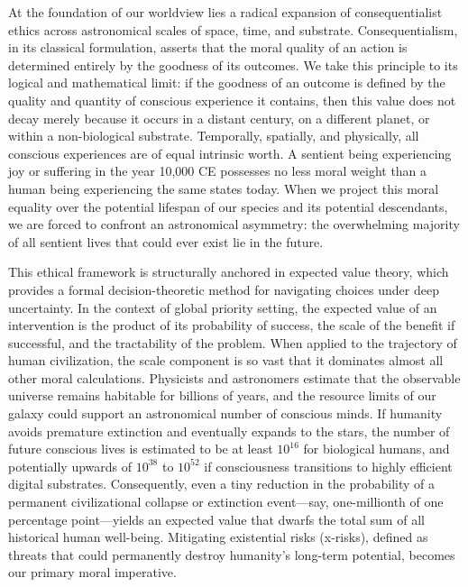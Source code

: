 At the foundation of our worldview lies a radical expansion of
consequentialist ethics across astronomical scales of space, time, and
substrate. Consequentialism, in its classical formulation, asserts that
the moral quality of an action is determined entirely by the goodness of
its outcomes. We take this principle to its logical and mathematical
limit: if the goodness of an outcome is defined by the quality and
quantity of conscious experience it contains, then this value does not
decay merely because it occurs in a distant century, on a different
planet, or within a non-biological substrate. Temporally, spatially, and
physically, all conscious experiences are of equal intrinsic worth. A
sentient being experiencing joy or suffering in the year 10,000 CE
possesses no less moral weight than a human being experiencing the same
states today. When we project this moral equality over the potential
lifespan of our species and its potential descendants, we are forced to
confront an astronomical asymmetry: the overwhelming majority of all
sentient lives that could ever exist lie in the future.

This ethical framework is structurally anchored in expected value
theory, which provides a formal decision-theoretic method for navigating
choices under deep uncertainty. In the context of global priority
setting, the expected value of an intervention is the product of its
probability of success, the scale of the benefit if successful, and the
tractability of the problem. When applied to the trajectory of human
civilization, the scale component is so vast that it dominates almost
all other moral calculations. Physicists and astronomers estimate that
the observable universe remains habitable for billions of years, and the
resource limits of our galaxy could support an astronomical number of
conscious minds. If humanity avoids premature extinction and eventually
expands to the stars, the number of future conscious lives is estimated
to be at least \(10^{16}\) for biological humans, and potentially
upwards of \(10^{38}\) to \(10^{52}\) if consciousness transitions to
highly efficient digital substrates. Consequently, even a tiny reduction
in the probability of a permanent civilizational collapse or extinction
event---say, one-millionth of one percentage point---yields an expected
value that dwarfs the total sum of all historical human well-being.
Mitigating existential risks (x-risks), defined as threats that could
permanently destroy humanity's long-term potential, becomes our primary
moral imperative.

